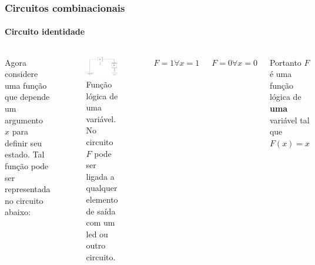 \begin{frame}
	\frametitle{Circuitos combinacionais}
	\framesubtitle{Circuito identidade}
	\begin{columns}
		\par Agora considere uma função que depende um argumento $x$ para definir seu estado. Tal função pode ser representada no circuito abaixo:
		
		\begin{figure}
			\centering
			\includegraphics[width=0.7\linewidth]{images/funcaoLogica1var}
			\caption{Função lógica de uma variável. No circuito $F$ pode ser ligada a qualquer elemento de saída com um led ou outro circuito.}
			\label{fig:funcaologica1var}
		\end{figure}
		
		\par $F = 1 \forall x=1$
		\par $F = 0 \forall x=0$
		\par Portanto $F$ é uma função lógica de \textbf{uma} variável tal que $F(x)=x$
		
	\end{columns}
\end{frame}

